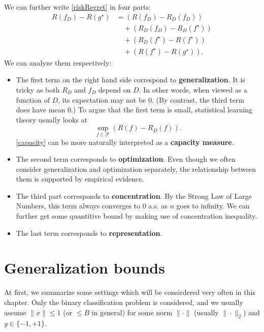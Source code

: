 \documentclass[openany]{book}
\theoremstyle{definition}
\theoremstyle{remark}
\begin{document}
We can further write \eqref{riskRegret} in four parts:
\begin{equation}\label{fullRiskBound}
    \begin{split}
        R(f_{D})-R(g^{\star}) & =\left(R(f_{D})-R_{D}(f_{D})\right) \\
         & \quad+\left(R_{D}(f_{D})-R_{D}(f^{\star})\right) \\
         & \quad+\left(R_{D}(f^{\star})-R(f^{\star})\right) \\
         & \quad+\left(R(f^{\star})-R(g^{\star})\right).
    \end{split}
\end{equation}
We can analyze them respectively:
\begin{itemize}
    \item The first term on the right hand side correspond to \textbf{generalization}. It is tricky as both $R_{D}$ and $f_{D}$ depend on $D$. In other words, when viewed as a function of $D$, its expectation may not be $0$. (By contrast, the third term does have mean 0.) To argue that the first term is small, statistical learning theory usually looks at
    \begin{equation}\label{capacity}
        \sup_{f\in \mathcal{F}}\left(R(f)-R_D(f)\right).
    \end{equation}
    \eqref{capacity} can be more naturally interpreted as a \textbf{capacity measure}.

    \item The second term corresponds to \textbf{optimization}. Even though we often consider generalization and optimization separately, the relationship between them is supported by empirical evidence.

    \item The third part corresponds to \textbf{concentration}. By the Strong Law of Large Numbers, this term always converges to $0$ a.s. as $n$ goes to infinity. We can further get some quantitive bound by making use of concentration inequality.

    \item The last term corresponds to \textbf{representation}.
\end{itemize}

\chapter{Generalization bounds}
At first, we summarize some settings which will be consirdered very often in this chapter. Only the binary classification problem is considered, and we usually assume $\|x\|\le1$ (or $\le B$ in general) for some norm $\|\cdot\|$ (usually $\|\cdot\|_2$) and $y\in\{-1,+1\}$.
\end{document}
